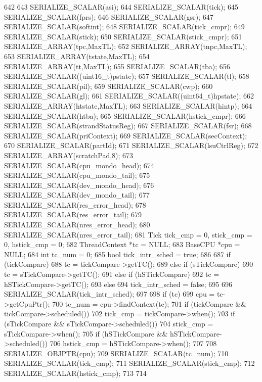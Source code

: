 \begin{DoxyCode}
642 {
643     SERIALIZE_SCALAR(asi);
644     SERIALIZE_SCALAR(tick);
645     SERIALIZE_SCALAR(fprs);
646     SERIALIZE_SCALAR(gsr);
647     SERIALIZE_SCALAR(softint);
648     SERIALIZE_SCALAR(tick_cmpr);
649     SERIALIZE_SCALAR(stick);
650     SERIALIZE_SCALAR(stick_cmpr);
651     SERIALIZE_ARRAY(tpc,MaxTL);
652     SERIALIZE_ARRAY(tnpc,MaxTL);
653     SERIALIZE_ARRAY(tstate,MaxTL);
654     SERIALIZE_ARRAY(tt,MaxTL);
655     SERIALIZE_SCALAR(tba);
656     SERIALIZE_SCALAR((uint16_t)pstate);
657     SERIALIZE_SCALAR(tl);
658     SERIALIZE_SCALAR(pil);
659     SERIALIZE_SCALAR(cwp);
660     SERIALIZE_SCALAR(gl);
661     SERIALIZE_SCALAR((uint64_t)hpstate);
662     SERIALIZE_ARRAY(htstate,MaxTL);
663     SERIALIZE_SCALAR(hintp);
664     SERIALIZE_SCALAR(htba);
665     SERIALIZE_SCALAR(hstick_cmpr);
666     SERIALIZE_SCALAR(strandStatusReg);
667     SERIALIZE_SCALAR(fsr);
668     SERIALIZE_SCALAR(priContext);
669     SERIALIZE_SCALAR(secContext);
670     SERIALIZE_SCALAR(partId);
671     SERIALIZE_SCALAR(lsuCtrlReg);
672     SERIALIZE_ARRAY(scratchPad,8);
673     SERIALIZE_SCALAR(cpu_mondo_head);
674     SERIALIZE_SCALAR(cpu_mondo_tail);
675     SERIALIZE_SCALAR(dev_mondo_head);
676     SERIALIZE_SCALAR(dev_mondo_tail);
677     SERIALIZE_SCALAR(res_error_head);
678     SERIALIZE_SCALAR(res_error_tail);
679     SERIALIZE_SCALAR(nres_error_head);
680     SERIALIZE_SCALAR(nres_error_tail);
681     Tick tick_cmp = 0, stick_cmp = 0, hstick_cmp = 0;
682     ThreadContext *tc = NULL;
683     BaseCPU *cpu = NULL;
684     int tc_num = 0;
685     bool tick_intr_sched = true;
686 
687     if (tickCompare)
688         tc = tickCompare->getTC();
689     else if (sTickCompare)
690         tc = sTickCompare->getTC();
691     else if (hSTickCompare)
692         tc = hSTickCompare->getTC();
693     else
694         tick_intr_sched = false;
695 
696     SERIALIZE_SCALAR(tick_intr_sched);
697 
698     if (tc) {
699         cpu = tc->getCpuPtr();
700         tc_num = cpu->findContext(tc);
701         if (tickCompare && tickCompare->scheduled())
702             tick_cmp = tickCompare->when();
703         if (sTickCompare && sTickCompare->scheduled())
704             stick_cmp = sTickCompare->when();
705         if (hSTickCompare && hSTickCompare->scheduled())
706             hstick_cmp = hSTickCompare->when();
707 
708         SERIALIZE_OBJPTR(cpu);
709         SERIALIZE_SCALAR(tc_num);
710         SERIALIZE_SCALAR(tick_cmp);
711         SERIALIZE_SCALAR(stick_cmp);
712         SERIALIZE_SCALAR(hstick_cmp);
713     }
714 }
\end{DoxyCode}
